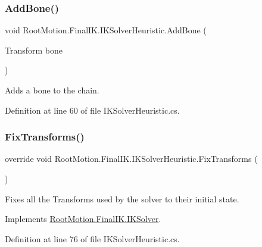 \subsubsection{\texorpdfstring{Add\+Bone()}{AddBone()}}
{\footnotesize\ttfamily void Root\+Motion.\+Final\+I\+K.\+I\+K\+Solver\+Heuristic.\+Add\+Bone (\begin{DoxyParamCaption}\item[{Transform}]{bone }\end{DoxyParamCaption})}



Adds a bone to the chain. 



Definition at line 60 of file I\+K\+Solver\+Heuristic.\+cs.

\mbox{\label{class_root_motion_1_1_final_i_k_1_1_i_k_solver_heuristic_a8cd9cbe3bd3bd871cc288e4ef7da4f33}} 
\subsubsection{\texorpdfstring{Fix\+Transforms()}{FixTransforms()}}
{\footnotesize\ttfamily override void Root\+Motion.\+Final\+I\+K.\+I\+K\+Solver\+Heuristic.\+Fix\+Transforms (\begin{DoxyParamCaption}{ }\end{DoxyParamCaption})\hspace{0.3cm}{\ttfamily [virtual]}}



Fixes all the Transforms used by the solver to their initial state. 



Implements \mbox{\hyperlink{class_root_motion_1_1_final_i_k_1_1_i_k_solver_a266ec32ebdd83faaf37abc41718061b7}{Root\+Motion.\+Final\+I\+K.\+I\+K\+Solver}}.



Definition at line 76 of file I\+K\+Solver\+Heuristic.\+cs.

\mbox{\label{class_root_motion_1_1_final_i_k_1_1_i_k_solver_heuristic_a6f6fe66f3e434877da9d23e492448fda}} 
